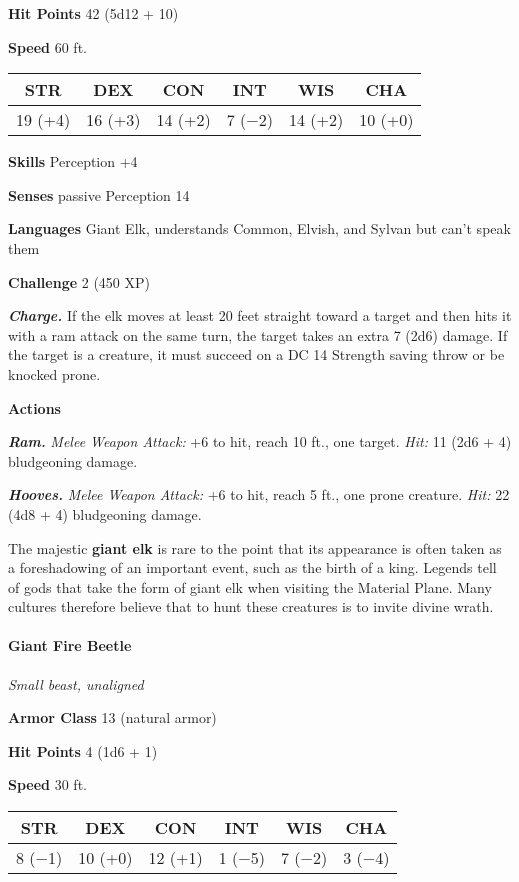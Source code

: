 \documentclass[
]{article}
\begin{document}
\textbf{Hit Points} 42 (5d12 + 10)

\textbf{Speed} 60 ft.

\begin{longtable}[]{@{}cccccc@{}}
\toprule
STR & DEX & CON & INT & WIS & CHA\tabularnewline
\midrule
\endhead
19 (+4) & 16 (+3) & 14 (+2) & 7 (−2) & 14 (+2) & 10 (+0)\tabularnewline
\bottomrule
\end{longtable}

\textbf{Skills} Perception +4

\textbf{Senses} passive Perception 14

\textbf{Languages} Giant Elk, understands Common, Elvish, and Sylvan but
can't speak them

\textbf{Challenge} 2 (450 XP)

\emph{\textbf{Charge.}} If the elk moves at least 20 feet straight
toward a target and then hits it with a ram attack on the same turn, the
target takes an extra 7 (2d6) damage. If the target is a creature, it
must succeed on a DC 14 Strength saving throw or be knocked prone.

\textbf{Actions}

\emph{\textbf{Ram.}} \emph{Melee Weapon Attack:} +6 to hit, reach 10
ft., one target. \emph{Hit:} 11 (2d6 + 4) bludgeoning damage.

\emph{\textbf{Hooves.}} \emph{Melee Weapon Attack:} +6 to hit, reach 5
ft., one prone creature. \emph{Hit:} 22 (4d8 + 4) bludgeoning damage.

The majestic \textbf{giant elk} is rare to the point that its appearance
is often taken as a foreshadowing of an important event, such as the
birth of a king. Legends tell of gods that take the form of giant elk
when visiting the Material Plane. Many cultures therefore believe that
to hunt these creatures is to invite divine wrath.

\hypertarget{giant-fire-beetle}{%
\paragraph{Giant Fire Beetle}\label{giant-fire-beetle}}

\emph{Small beast, unaligned}

\textbf{Armor Class} 13 (natural armor)

\textbf{Hit Points} 4 (1d6 + 1)

\textbf{Speed} 30 ft.

\begin{longtable}[]{@{}cccccc@{}}
\toprule
STR & DEX & CON & INT & WIS & CHA\tabularnewline
\midrule
\endhead
8 (−1) & 10 (+0) & 12 (+1) & 1 (−5) & 7 (−2) & 3 (−4)\tabularnewline
\bottomrule
\end{longtable}
\end{document}
